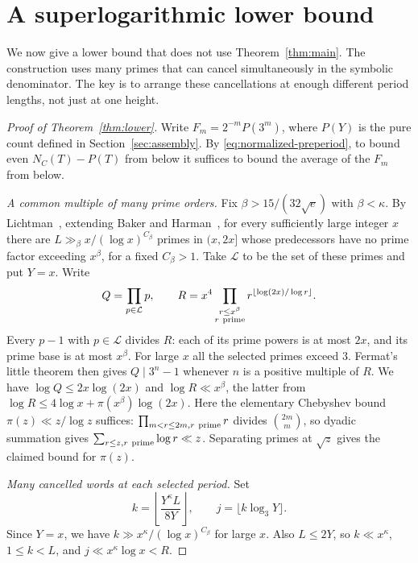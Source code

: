 \section{A superlogarithmic lower bound}\label{sec:lower}

We now give a lower bound that does not use
Theorem~\ref{thm:main}. The construction uses many primes that can
cancel simultaneously in the symbolic denominator. The key is to
arrange these cancellations at enough different period lengths, not
just at one height.

\begin{proof}[Proof of Theorem~\ref{thm:lower}]
Write \(F_m=2^{-m}P(3^m)\), where \(P(Y)\) is the pure count defined
in Section~\ref{sec:assembly}. By \eqref{eq:normalized-preperiod}, to bound even \(N_C(T)-P(T)\) from below
it suffices to bound the average of the \(F_m\) from below.

\smallskip
\noindent\emph{A common multiple of many prime orders.}
Fix \(\beta>15/(32\sqrt e)\) with \(\beta<\kappa\).
By Lichtman~\cite[Theorem~1.1]{Lichtman2022}, extending
Baker and Harman~\cite[Theorem~1]{BH1998}, for every sufficiently large
integer \(x\) there are \(L\gg_\beta x/(\log x)^{C_\beta}\) primes
in \((x,2x]\) whose predecessors have no prime factor exceeding
\(x^\beta\), for a fixed \(C_\beta>1\). Take \(\mathcal L\) to be the
set of these primes and put \(Y=x\). Write
\[
 Q=\prod_{p\in\mathcal L}p,\qquad
 R=x^4\prod_{\substack{r\le x^\beta\\r\ {\rm prime}}}
                       r^{\lfloor\log(2x)/\log r\rfloor}.
\]
Every \(p-1\) with \(p\in\mathcal L\) divides \(R\): each of its
prime powers is at most \(2x\), and its prime base is at most
\(x^\beta\). For large \(x\) all the selected primes exceed \(3\).
Fermat's little theorem then gives \(Q\mid 3^n-1\) whenever
\(n\) is a positive multiple of \(R\).
We have \(\log Q\le 2x\log(2x)\) and
\(\log R\ll x^\beta\), the latter from
\(\log R\le4\log x+\pi(x^\beta)\log(2x)\).
Here the elementary Chebyshev bound \(\pi(z)\ll z/\log z\) suffices:
\(\prod_{m<r\le2m, r\ {\rm prime}}r\) divides \(\binom{2m}{m}\),
so dyadic summation gives \(\sum_{r\le z, r\ {\rm prime}}\log r\ll z\).
Separating primes at \(\sqrt z\) gives the claimed bound for \(\pi(z)\).

\smallskip
\noindent\emph{Many cancelled words at each selected period.}
Set
\[
 k=\left\lfloor\frac{Y^\kappa L}{8Y}\right\rfloor,
 \qquad j=\lfloor k\log_3Y\rfloor .
\]
Since \(Y=x\), we have
\(k\gg x^\kappa/(\log x)^{C_\beta}\) for large \(x\). Also \(L\le2Y\),
so \(k\ll x^\kappa\), \(1\le k<L\), and \(j\ll x^\kappa\log x<R\).


\end{proof}
